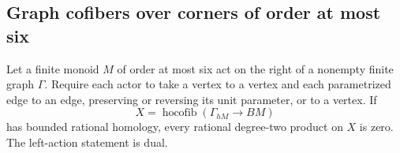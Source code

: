\subsection{Graph cofibers over corners of order at most six}

\begin{theorem}
\label{CP2:A-baseline-six-graph}
Let a finite monoid $M$ of order at most six act on the
right of a nonempty finite graph $\Gamma$.  Require each
actor to take a vertex to a vertex and each parametrized
edge to an edge, preserving or reversing its unit parameter,
or to a vertex.  If
\[
 X=\operatorname{hocofib}(\Gamma_{hM}\longrightarrow BM)
\]
has bounded rational homology, every rational degree-two
product on $X$ is zero.  The left-action statement is dual.
\end{theorem}
